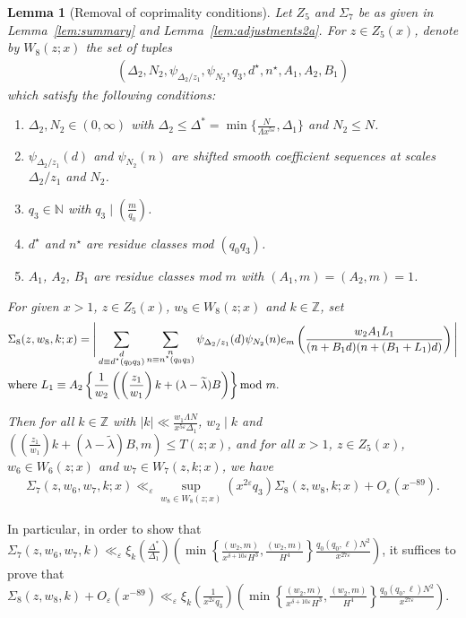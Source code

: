 \documentclass{amsart}
\newtheorem{lemma}{Lemma}
\numberwithin{equation}{section}
\begin{document}
 
\begin{lemma}[Removal of coprimality conditions]\label{lem:adjustments2}  Let $Z_5$ and $\Sigma_7$ be as given in Lemma~{\rm\ref{lem:summary}} and  Lemma~{\rm\ref{lem:adjustments2a}}.
 For $z \in Z_5(x)$, denote by $W_8(z;x)$ the set of tuples
\begin{align*}
(\Delta_2, N_2, \psi_{\Delta_2/z_1}, \psi_{N_2}, q_3, d^\star, n^\star, A_1, A_2, B_1)
\end{align*}
which satisfy the following conditions: 
\begin{enumerate}[{\rm (i)}]
\item $\Delta_2, N_2 \in (0,\infty)$ with $\Delta_2 \leq \Delta^*= \min\{\frac{N}{\Lambda x^{5\varepsilon}}, \Delta_1\}$ and $N_2 \leq N$. 
\item $\psi_{\Delta_2/z_1}(d)$  and $\psi_{N_2}(n)$  are shifted smooth coefficient sequences at scales $\Delta_2/z_1 $ and $N_2 $. 
\item $q_3 \in \mathbb{N}$ with 
 $q_3 \mid (\frac{m}{q_0})$.
\item  $d^\star$ and $n^\star$ are residue classes mod $(q_0q_3)$.
\item $A_1$, $A_2$, $B_1$ are residue classes mod $m$ with $(A_1,m)=(A_2,m)=1$. 
\end{enumerate}
For given $x>1$, $z \in Z_5(x)$, $w_8 \in W_8(z;x)$ and $k \in \mathbb{Z}$,  set 
 \begin{align*}
&\Sigma_8(z,w_8,k;x) =  \Bigg|  \sum_{\substack{d \\  d \equiv d^\star  (q_0q_3) }} \sum_{\substack{n \\   n \equiv n^\star  (q_0q_3)    }}  \psi_{\Delta_2/z_1}(d)\psi_{N_2}(n)  e_{m}\left(\dfrac{w_2A_1L_1}{( n+B_1 d)(  n+(B_1+L_1)d)}\right) \Bigg| \\
&\mbox{where }  L_1 \equiv  A_2 \left\{\dfrac{1}{w_2}\left(\left(\frac{z_1}{w_1}\right)k + (\lambda-\widetilde{\lambda})B\right)\right\} \mbox{\rm mod } m.
\end{align*}

Then for all $k \in \mathbb{Z}$ 
 with $|k| \ll  \frac{w_1\Lambda N}{x^{5\varepsilon}\Delta_1}$, $w_2 \mid k$ and  $((\frac{z_1}{w_1})k+(\lambda-\widetilde{\lambda})B,m) \leq T(z;x)$, and for all $x>1$, $z \in Z_5(x)$, $w_6 \in W_6(z;x)$ and $w_7 \in W_7(z,k;x)$, we have
 \begin{align*}
 \Sigma_7(z,w_6,w_7, k;x) \ll_\varepsilon \sup_{w_8 \in W_8(z;x)} \left( x^{2\varepsilon} q_3 \right) \Sigma_8(z,w_8,k;x) + O_\varepsilon(x^{-89}).
 \end{align*}
\end{lemma}
In particular, in order to show that $\Sigma_7(z,w_6,w_7,k) \ll_\varepsilon \xi_k  \left( \frac{\Delta^*}{\Delta_1}\right)\left(\min\left\{\frac{(w_2,m)}{x^{\delta+10\varepsilon}H^3},\frac{(w_2,m)}{H^4}\right\}\frac{q_0(q_0,\ell)  N^2}{ x^{27\varepsilon}} \right)$, it suffices to prove  that $\Sigma_8(z,w_8,k) + O_\varepsilon(x^{-89}) \ll_\varepsilon \xi_k   \left( \frac{1}{x^{2\varepsilon} q_3} \right) \left(\min\left\{\frac{(w_2,m)}{x^{\delta+10\varepsilon}H^3},\frac{(w_2,m)}{H^4}\right\}\frac{q_0(q_0,\ell)  N^2}{ x^{27\varepsilon}} \right)$.
\end{document}
